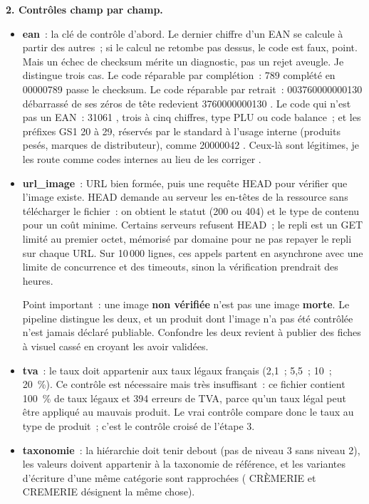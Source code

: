 \documentclass[11pt,a4paper]{article}
\begin{document}
\textbf{2. Contrôles champ par champ.}
\begin{itemize}
  \item \textbf{ean}~: la clé de contrôle d'abord. Le dernier chiffre d'un EAN se calcule à partir
        des autres~; si le calcul ne retombe pas dessus, le code est faux, point. Mais un échec de
        checksum mérite un diagnostic, pas un rejet aveugle. Je distingue trois cas. Le code
        réparable par complétion~: \guillemotleft{} 789 \guillemotright{} complété en \guillemotleft{} 00000789 \guillemotright{} passe le checksum. Le code
        réparable par retrait~: \guillemotleft{} 003760000000130 \guillemotright{} débarrassé de ses zéros de tête redevient
        \guillemotleft{} 3760000000130 \guillemotright{}. Le code qui n'est pas un EAN~: \guillemotleft{} 31061 \guillemotright{}, trois à cinq chiffres, type
        PLU ou code balance~; et les préfixes GS1 20 à 29, réservés par le standard à l'usage
        interne (produits pesés, marques de distributeur), comme \guillemotleft{} 20000042 \guillemotright{}. Ceux-là sont
        légitimes, je les route comme codes internes au lieu de les \guillemotleft{} corriger \guillemotright{}.
  \item \textbf{url\_image}~: URL bien formée, puis une requête HEAD pour vérifier que l'image
        existe. HEAD demande au serveur les en-têtes de la ressource sans télécharger le fichier~:
        on obtient le statut (200 ou 404) et le type de contenu pour un coût minime. Certains
        serveurs refusent HEAD~; le repli est un GET limité au premier octet, mémorisé par domaine
        pour ne pas repayer le repli sur chaque URL. Sur 10\,000 lignes, ces appels partent en
        asynchrone avec une limite de concurrence et des timeouts, sinon la vérification prendrait
        des heures.

        Point important~: une image \textbf{non vérifiée} n'est pas une image \textbf{morte}. Le
        pipeline distingue les deux, et un produit dont l'image n'a pas été contrôlée n'est jamais
        déclaré publiable. Confondre les deux revient à publier des fiches à visuel cassé en
        croyant les avoir validées.
  \item \textbf{tva}~: le taux doit appartenir aux taux légaux français (2,1~; 5,5~; 10~; 20~\%).
        Ce contrôle est nécessaire mais très insuffisant~: ce fichier
        contient 100~\% de taux légaux et 394 erreurs de TVA, parce qu'un taux légal peut
        être appliqué au mauvais produit. Le vrai
        contrôle compare donc le taux au type de produit~; c'est le contrôle croisé de l'étape 3.
  \item \textbf{taxonomie}~: la hiérarchie doit tenir debout (pas de niveau 3 sans niveau 2), les
        valeurs doivent appartenir à la taxonomie de référence, et les variantes d'écriture d'une
        même catégorie sont rapprochées (\guillemotleft{} CRÈMERIE \guillemotright{} et \guillemotleft{} CREMERIE \guillemotright{} désignent la même chose).
\end{itemize}
\end{document}
